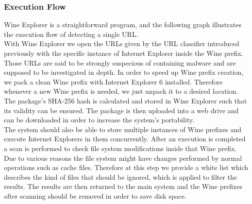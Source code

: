 \subsubsection{Execution Flow}
Wine Explorer is a straightforward program, and the following graph 
illustrates the execution flow of detecting a single URL. \\
With Wine Explorer we open the URLs given by the URL classifier introduced 
previously with the specific instance of Internet Explorer inside the Wine 
prefix. 
Those URLs are said to be strongly suspecious of containing malware and are 
supposed to be investigated in depth. 
In order to speed up Wine prefix creation, we pack a clean Wine prefix with 
Internet Explorer 6 installed. Therefore whenever a new Wine prefix is needed, 
we just unpack it to a desired location. 
The package's SHA-256 hash is calculated and stored in Wine Explorer such that 
its validity can be ensured. 
The package is then uploaded into a web drive and can be downloaded in 
order to increase the system's portability. \\
The system should also be able to store multiple instances of Wine prefixes 
and execute Internet Explorers in them concurrently. 
After an execution is completed a scan is performed to check file system 
modifications inside that Wine prefix. 
Due to various reasons the file system might have changes performed by normal 
operations such as cache files. 
Therefore at this step we provide a white list which describes the kind of 
files that should be ignored, which is applied to filter the results. 
The results are then returned to the main system and the Wine prefixes after 
scanning should be removed in order to save disk space. 

